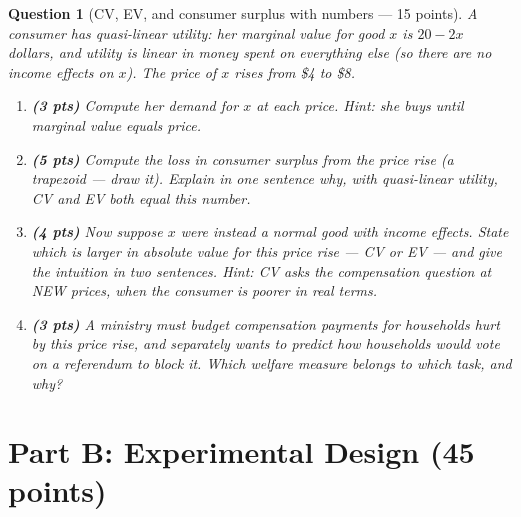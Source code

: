 \documentclass[11pt]{article}
\newtheorem{question}{Question}
\begin{document}
\begin{question}[CV, EV, and consumer surplus with numbers --- 15 points]
A consumer has quasi-linear utility: her marginal value for good $x$ is
$20 - 2x$ dollars, and utility is linear in money spent on everything else
(so there are no income effects on $x$). The price of $x$ rises from
\$4 to \$8.

\begin{enumerate}[label=(\alph*)]
  \item \textbf{(3 pts)} Compute her demand for $x$ at each price.
        \emph{Hint: she buys until marginal value equals price.}
  \item \textbf{(5 pts)} Compute the loss in consumer surplus from the
        price rise (a trapezoid --- draw it). Explain in one sentence why,
        with quasi-linear utility, CV and EV both equal this number.
  \item \textbf{(4 pts)} Now suppose $x$ were instead a \emph{normal good}
        with income effects. State which is larger \emph{in absolute
        value} for this price rise --- CV or EV --- and give the intuition
        in two sentences. \emph{Hint:
        CV asks the compensation question at NEW prices, when the consumer
        is poorer in real terms.}
  \item \textbf{(3 pts)} A ministry must budget compensation payments for
        households hurt by this price rise, and separately wants to
        predict how households would vote on a referendum to block it.
        Which welfare measure belongs to which task, and why?
\end{enumerate}
\end{question}

\section*{Part B: Experimental Design (45 points)}
\end{document}

